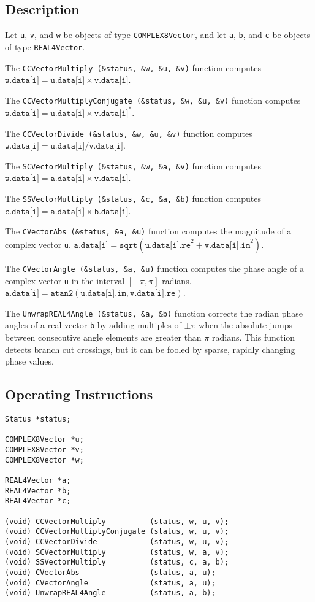 \documentclass{article}
\begin{document}
\subsection{Description}

Let \texttt{u}, \texttt{v}, and \texttt{w} be objects of type
\texttt{COMPLEX8Vector}, and let \texttt{a}, \texttt{b}, and \texttt{c} be
objects of type \texttt{REAL4Vector}.

The \verb:CCVectorMultiply (&status, &w, &u, &v): function computes
$\texttt{w.data[i]}=\texttt{u.data[i]}\times\texttt{v.data[i]}$.

The \verb:CCVectorMultiplyConjugate (&status, &w, &u, &v): function computes
$\texttt{w.data[i]}=\texttt{u.data[i]}\times\texttt{v.data[i]}^\ast$.

The \verb:CCVectorDivide (&status, &w, &u, &v): function computes
$\texttt{w.data[i]}=\texttt{u.data[i]}/\texttt{v.data[i]}$.

The \verb:SCVectorMultiply (&status, &w, &a, &v): function computes
$\texttt{w.data[i]}=\texttt{a.data[i]}\times\texttt{v.data[i]}$.

The \verb:SSVectorMultiply (&status, &c, &a, &b): function computes
$\texttt{c.data[i]}=\texttt{a.data[i]}\times\texttt{b.data[i]}$.

The \verb:CVectorAbs (&status, &a, &u): function computes
the magnitude of a complex vector \texttt{u}.
$\texttt{a.data[i]}=\texttt{sqrt} (
\texttt{u.data[i].re}^2 + \texttt{v.data[i].im}^2 ) $.


The \verb:CVectorAngle (&status, &a, &u): function computes
the phase angle of a complex vector \texttt{u}
 in the interval $[-\pi, \pi]$ radians.\\
$\texttt{a.data[i]}=\texttt{atan2} (
\texttt{u.data[i].im}, \texttt{v.data[i].re} ) $.

The \verb:UnwrapREAL4Angle (&status, &a, &b): function
 corrects the radian phase angles of a real vector  \texttt{b}
 by adding multiples of
 $\pm\pi$ when the absolute jumps between consecutive
 angle elements are greater than $\pi$ radians.
This function detects branch cut crossings, but it can be 
 fooled by sparse, rapidly changing phase values.


\subsection{Operating Instructions}


\begin{verbatim}
Status *status; 

COMPLEX8Vector *u;
COMPLEX8Vector *v;
COMPLEX8Vector *w;

REAL4Vector *a;
REAL4Vector *b;
REAL4Vector *c;

(void) CCVectorMultiply          (status, w, u, v);
(void) CCVectorMultiplyConjugate (status, w, u, v);
(void) CCVectorDivide            (status, w, u, v);
(void) SCVectorMultiply          (status, w, a, v);
(void) SSVectorMultiply          (status, c, a, b);
(void) CVectorAbs                (status, a, u);
(void) CVectorAngle              (status, a, u);
(void) UnwrapREAL4Angle          (status, a, b);
\end{verbatim}
\end{document}
